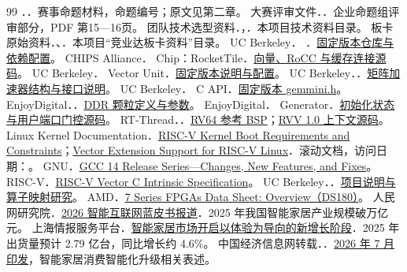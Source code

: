 \clearpage
\renewcommand{\refname}{参考资料}
\begin{thebibliography}{99}
\small
\setlength{\itemsep}{.35em}
 \ChallengeCompany{}．\SourceChallengeName{}．赛事命题材料，命题编号\ChallengeIdentifier{}；原文见第二章。
 大赛评审文件．\SourceRulesName{}．企业命题组评审部分，PDF 第15—16页。
 团队技术选型资料．\SourceTechnicalReportName{}，\TechnicalBaselineDate{}．本项目技术资料目录。
 板卡原始资料．\SourceBoardName{}、\SourceBoardPinName{}．本项目“竞业达板卡资料”目录。
 UC Berkeley．\IntegrationFramework{} \IntegrationVersion{}．\href{\SourceChipyardURL}{固定版本仓库与依赖配置}。
 CHIPS Alliance．\ProcessorCore{} Chip：RocketTile．\href{\SourceRocketURL}{向量、RoCC 与缓存连接源码}。
 UC Berkeley．\VectorUnit{} Vector Unit．\href{\SourceSaturnURL}{固定版本说明与配置}。
 UC Berkeley．\AcceleratorName{}．\href{\SourceGemminiURL}{矩阵加速器结构与接口说明}。
 UC Berkeley．\AcceleratorName{} C API．\href{\SourceGemminiLibraryURL}{固定版本 gemmini.h}。
 EnjoyDigital．\MemoryController{}．\href{\SourceLiteDRAMURL}{DDR 颗粒定义与参数}。
 EnjoyDigital．\MemoryController{} Generator．\href{\SourceLiteDRAMInitURL}{初始化状态与用户端口门控源码}。
 RT-Thread．\RealTimeSystemVersion{}．\href{\SourceRTThreadURL}{RV64 参考 BSP}；\href{\SourceRTVectorURL}{RVV 1.0 上下文源码}。
 Linux Kernel Documentation．\href{\SourceLinuxBootURL}{RISC-V Kernel Boot Requirements and Constraints}；\href{\SourceLinuxVectorURL}{Vector Extension Support for RISC-V Linux}．滚动文档，访问日期：\TechnicalBaselineDate{}。
 GNU．\href{\SourceGCCURL}{GCC 14 Release Series—Changes, New Features, and Fixes}。
 RISC-V．\href{\SourceRVVURL}{RISC-V Vector C Intrinsic Specification}。
 UC Berkeley．\ResearchCompiler{}．\href{\SourceMerlinURL}{项目说明与算子映射研究}。
 AMD．\href{\SourceAMDURL}{7 Series FPGAs Data Sheet: Overview（DS180）}。
 人民网研究院．\href{\SourceSmartHomeScaleURL}{2026 智能互联网蓝皮书报道}．2025 年我国智能家居产业规模破万亿元。
 上海情报服务平台．\href{\SourceSmartHomeShipmentURL}{智能家居市场开启以体验为导向的新增长阶段}．2025 年出货量预计 2.79 亿台，同比增长约 4.6\%。
 中国经济信息网转载．\SourceSmartHomePolicyName{}．\href{\SourceSmartHomePolicyURL}{2026 年 7 月印发}，智能家居消费智能化升级相关表述。

\end{thebibliography}
